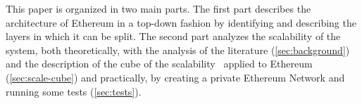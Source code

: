This paper is organized in two main parts. The first part describes the
architecture of Ethereum in a top-down fashion by identifying and describing the
layers in which it can be split. The second part analyzes the scalability of the
system, both theoretically, with the analysis of the literature
(\autoref{sec:background}) and the description of the cube of the
scalability~\cite{bib:art-of-scalability} applied to Ethereum
(\autoref{sec:scale-cube}) and practically, by creating a private Ethereum
Network and running some tests (\autoref{sec:tests}).
